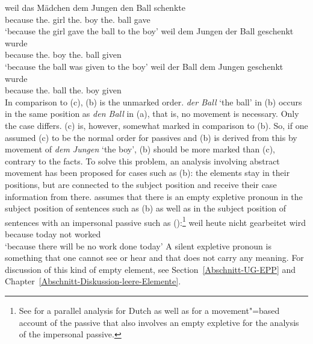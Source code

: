 \eal
\label{ex-passive-German-no-movement}
\ex 
\gll weil das Mädchen dem Jungen den Ball schenkte\\
     because the.\nom{} girl the.\dat{} boy the.\acc{} ball gave\\
\glt `because the girl gave the ball to the boy'
\ex 
\gll weil dem Jungen der Ball geschenkt wurde\\
     because the.\dat{} boy the.\nom{} ball given \AUX\\
\glt `because the ball was given to the boy'
\ex 
\gll weil der Ball dem Jungen geschenkt wurde\\
     because the.\nom{} ball the.\dat{} boy given \AUX\\
\zl
In comparison to (c), (b) is the unmarked order. \emph{der Ball} `the ball' in (b) occurs
in the same position as \emph{den Ball} in (a), that is, no movement is necessary. Only the case differs.
(c) is, however, somewhat marked in comparison to (b). So, if one assumed (c) to
be the normal order for passives and (b) is derived from this by movement of \emph{dem
  Jungen} `the boy', (b) should be more marked than (c), contrary to the facts. To
solve this problem, an analysis involving abstract movement has been proposed for
cases such as (b): the elements stay in their positions, but are connected to
the subject position and receive their case information from there. \parencites[155--157]{Grewendorf88a}[]{Grewendorf93}
assumes that there is an empty expletive pronoun
in the subject position of sentences such as (b) as well as in the subject position of sentences with an
impersonal passive such as ():\footnote{%
	See  for a parallel analysis for Dutch as well as 
	 for a movement"=based account of the passive that also involves an
        empty expletive for the analysis of the impersonal passive.
}
\ea
\gll weil heute nicht gearbeitet wird\\
	 because today not worked \AUX\\
\glt `because there will be no work done today'
\z
A silent expletive pronoun is something that one cannot see or hear and that does not carry any meaning. For discussion of 
this kind of empty element, see Section~\ref{Abschnitt-UG-EPP} and Chapter~\ref{Abschnitt-Diskussion-leere-Elemente}.

